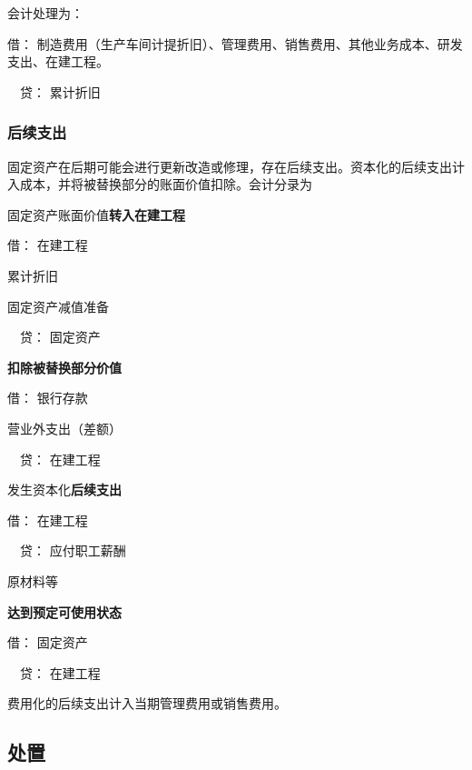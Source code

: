 \documentclass[UTF8,12pt]{ctexart}
\newenvironment{Dr}{\noindent 借：}{\par}
\newenvironment{Cr}{\noindent \ \ 贷：}{\par}
\numberwithin{equation}{section} %
\numberwithin{figure}{section}
\numberwithin{table}{section}
\begin{document}
	会计处理为：
	
	\begin{Dr}
		制造费用（生产车间计提折旧）、管理费用、销售费用、其他业务成本、研发支出、在建工程。
	\end{Dr}
	\begin{Cr}
		累计折旧
	\end{Cr}
	
	\subsubsection{后续支出}
	
	固定资产在后期可能会进行更新改造或修理，存在后续支出。资本化的后续支出计入成本，并将被替换部分的账面价值扣除。会计分录为
	
	固定资产账面价值\textbf{转入在建工程}
	
	\begin{Dr}
		在建工程
		
		累计折旧
		
		固定资产减值准备
	\end{Dr}
	\begin{Cr}
		固定资产
	\end{Cr}
	
	\textbf{扣除被替换部分价值}
	
	\begin{Dr}
		银行存款
		
		营业外支出（差额）
	\end{Dr}
	\begin{Cr}
		在建工程
	\end{Cr}

	
	发生资本化\textbf{后续支出}
	
	\begin{Dr}
		在建工程
	\end{Dr}
	\begin{Cr}
		应付职工薪酬
		
		原材料等
	\end{Cr}
	
	\textbf{达到预定可使用状态}
	
	\begin{Dr}
		固定资产
	\end{Dr}
	\begin{Cr}
		在建工程
	\end{Cr}

	
	费用化的后续支出计入当期管理费用或销售费用。
	
	
	
	\subsection{处置}
	
\end{document}
